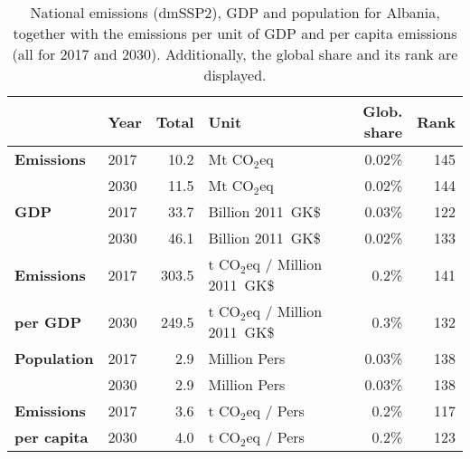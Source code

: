 \documentclass[12pt]{article}
\begin{document}
 \begin{table}[htbp]
 \centering
 \caption{National emissions (dmSSP2), GDP and population for Albania, together with the emissions per unit of GDP and per capita emissions (all for 2017 and 2030). 
 Additionally, the global share and its rank are displayed.}
 \label{tab:overview}
 \begin{tabular}{l || l r l r r}
 \bfseries  & \bfseries Year & \bfseries Total & \bfseries Unit & \bfseries Glob. share & \bfseries Rank \tabularnewline \hline \hline
 \bfseries Emissions & 2017 & 10.2 & Mt CO$_2$eq & 0.02\% & 145 \tabularnewline 
 \bfseries  & 2030 & 11.5 & Mt CO$_2$eq & 0.02\% & 144 \tabularnewline \hline
 \bfseries GDP & 2017 & 33.7 & Billion 2011~GK\$ & 0.03\% & 122 \tabularnewline 
 \bfseries  & 2030 & 46.1 & Billion 2011~GK\$ & 0.02\% & 133 \tabularnewline \hline
 \bfseries Emissions & 2017 & 303.5 & t CO$_2$eq / Million 2011~GK\$ & 0.2\% & 141 \tabularnewline 
 \bfseries per GDP & 2030 & 249.5 & t CO$_2$eq / Million 2011~GK\$ & 0.3\% & 132 \tabularnewline \hline
 \bfseries Population & 2017 & 2.9 & Million Pers & 0.03\% & 138 \tabularnewline 
 \bfseries  & 2030 & 2.9 & Million Pers & 0.03\% & 138 \tabularnewline \hline
 \bfseries Emissions & 2017 & 3.6 & t CO$_2$eq /  Pers & 0.2\% & 117 \tabularnewline 
 \bfseries per capita & 2030 & 4.0 & t CO$_2$eq /  Pers & 0.2\% & 123 \tabularnewline 
 \end{tabular}
 \end{table}
\end{document}
